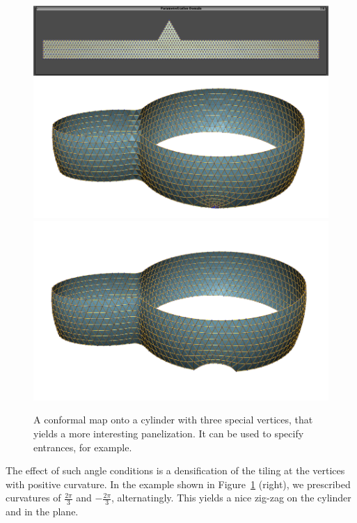 \documentclass[article.tex]{subfiles}
\begin{document}
\begin{figure}[b]
  \centering
  \includegraphics[width=.49\linewidth]{images/dc_entrance_map.png}
  \hfill
  \includegraphics[width=.49\linewidth]{images/dc_entrance_cut.png}
  \caption{A conformal map onto a cylinder with three special vertices, that yields a more interesting panelization. It can be used to specify entrances, for example.}
  \label{fig:entrance}
\end{figure}

The effect of such angle conditions is a densification of the tiling
at the vertices with positive curvature. In the example shown in
Figure~\ref{fig:entrance} (right), we prescribed curvatures of
$\tfrac{2\pi}{3}$ and $-\tfrac{2\pi}{3}$, alternatingly. This yields a
nice zig-zag on the cylinder and in the plane.
\end{document}
